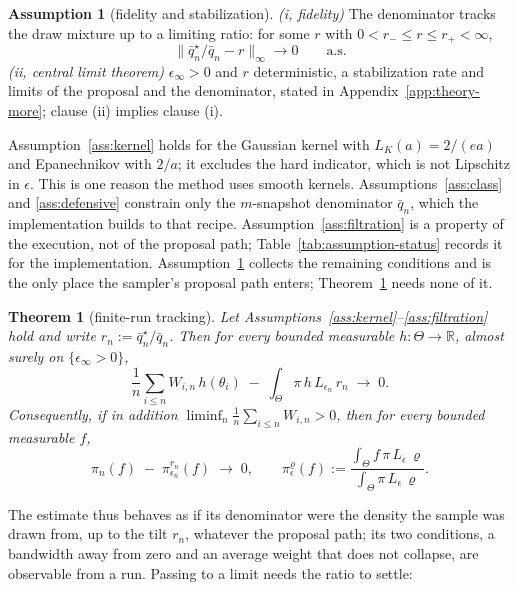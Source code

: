 \documentclass[10pt]{article}
\theoremstyle{plain}
\newtheorem{theorem}{Theorem}
\theoremstyle{definition}
\newtheorem{assumption}{Assumption}
\begin{document}
\begin{assumption}[fidelity and stabilization]\label{ass:stab} \emph{(i, fidelity)} The denominator tracks the draw mixture up to a limiting ratio: for some $r$ with $0<r_-\le r\le r_+<\infty$,
\begin{equation}
\bigl\|\bar q^\star_n/\bar q_n-r\bigr\|_\infty\longrightarrow0\qquad\text{a.s.}
\label{eq:fidelity}
\end{equation}
\emph{(ii, central limit theorem)} $\epsilon_\infty>0$ and $r$ deterministic, a stabilization rate and limits of the proposal and the denominator, stated in Appendix~\ref{app:theory-more}; clause (ii) implies clause (i).
\end{assumption}

Assumption~\ref{ass:kernel} holds for the Gaussian kernel with $L_K(a)=2/(ea)$ and Epanechnikov with $2/a$; it excludes the hard indicator, which is not Lipschitz in $\epsilon$. This is one reason the method uses smooth kernels. Assumptions~\ref{ass:class} and \ref{ass:defensive} constrain only the $m$-snapshot denominator $\bar q_n$, which the implementation builds to that recipe. Assumption~\ref{ass:filtration} is a property of the execution, not of the proposal path; Table~\ref{tab:assumption-status} records it for the implementation. Assumption~\ref{ass:stab} collects the remaining conditions and is the only place the sampler's proposal path enters; Theorem~\ref{thm:consistency} needs none of it.

\begin{theorem}[finite-run tracking]\label{thm:consistency}
Let Assumptions~\ref{ass:kernel}--\ref{ass:filtration} hold and write $r_n:=\bar q^\star_n/\bar q_n$. Then for every bounded measurable $h:\Theta\to\mathbb{R}$, almost surely on $\{\epsilon_\infty>0\}$,
\begin{equation}
\frac1n\sum_{i\le n}W_{i,n}\,h(\theta_i)\;-\;\int_\Theta \pi\,h\,L_{\epsilon_n}\,r_n\;\longrightarrow\;0 .
\label{eq:tracking}
\end{equation}
Consequently, if in addition $\liminf_n\tfrac1n\sum_{i\le n}W_{i,n}>0$, then for every bounded measurable $f$,
\begin{equation}
\widehat\pi_n(f)\;-\;\pi^{r_n}_{\epsilon_n}(f)\;\longrightarrow\;0,
\qquad
\pi^{\varrho}_{\epsilon}(f):=\frac{\int_\Theta f\,\pi\,L_{\epsilon}\,\varrho}{\int_\Theta \pi\,L_{\epsilon}\,\varrho}.
\label{eq:tracking-ratio}
\end{equation}
\end{theorem}

The estimate thus behaves as if its denominator were the density the sample was drawn from, up to the tilt $r_n$, whatever the proposal path; its two conditions, a bandwidth away from zero and an average weight that does not collapse, are observable from a run. Passing to a limit needs the ratio to settle:
\end{document}
